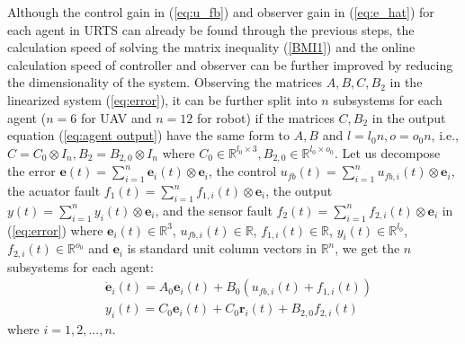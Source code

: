 \documentclass{ieeeaccess}
\begin{document}

Although the control gain in (\ref{eq:u_fb}) and observer gain in (\ref{eq:e_hat}) for each agent in URTS can already be found through the previous steps, the calculation speed of solving the matrix inequality (\ref{BMI1}) and the online calculation speed of controller and observer can be further improved by reducing the dimensionality of the system. Observing the matrices $A,B,C,B_2$ in the linearized system (\ref{eq:error}), it can be further split into $n$ subsystems for each agent ($n=6$ for UAV and $n=12$ for robot) if the matrices $C,B_2$ in the output equation (\ref{eq:agent output}) have the same form to $A,B$ and $l=l_0n, o=o_0n$, i.e., $C = C_0\otimes I_n,B_2 = B_{2,0}\otimes I_n$ where $C_0\in\mathbb{R}^{l_0\times 3},B_{2,0}\in\mathbb{R}^{l_0\times o_0}$. Let us decompose 
the error $\pmb{e}(t)=\sum_{i=1}^{n} \pmb{e}_i(t)\otimes\mathbf{e}_i$, 
the control $u_{fb}(t)=\sum_{i=1}^{n} {u}_{fb,i}(t)\otimes\mathbf{e}_i$, 
the acuator fault $f_{1}(t)=\sum_{i=1}^{n} {f}_{1,i}(t)\otimes\mathbf{e}_i$, 
the output $y(t)=\sum_{i=1}^{n} {y}_i(t)\otimes\mathbf{e}_i$, 
and the sensor fault $f_{2}(t)=\sum_{i=1}^{n} {f}_{2,i}(t)\otimes\mathbf{e}_i$ in (\ref{eq:error})
where $\pmb{e}_i(t)\in\mathbb{R}^3$, $u_{fb,i}(t)\in\mathbb{R}$, $f_{1,i}(t)\in\mathbb{R}$, $y_i(t)\in\mathbb{R}^{l_0}$, $f_{2,i}(t)\in\mathbb{R}^{o_0}$ and $\mathbf{e}_i$ is standard unit column vectors in $\mathbb{R}^n$, we get the $n$ subsystems for each agent:
\begin{equation} \label{eq:linear subsys}
    \begin{split}
        & \dot{\pmb{e}}_i(t)=A_0\pmb{e}_i(t)+B_0(u_{fb,i}(t)+f_{1,i}(t)) \\
        & {y}_i(t)=C_0\pmb{e}_i(t) + C_0\pmb{r}_i(t) + B_{2,0}f_{2,i}(t)   
    \end{split}
\end{equation} where $i=1,2,...,n$.
\end{document}
